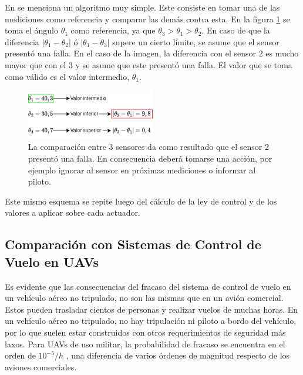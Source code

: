 En \cite[p.~221]{collinson2023introduction} se menciona un algoritmo muy simple. Este consiste en tomar una de las mediciones como referencia y comparar las demás contra esta. En la figura \ref{fig:votacion_sensores} se toma el ángulo $\theta_1$ como referencia, ya que $\theta_3 > \theta_1 > \theta_2$. En caso de que la diferencia $| \theta_1 - \theta_2 |$ ó $| \theta_1 - \theta_3 |$ supere un cierto límite, se asume que el sensor presentó una falla. En el caso de la imagen, la diferencia con el sensor 2 es mucho mayor que con el 3 y se asume que este presentó una falla. El valor que se toma como válido es el valor intermedio, $\theta_1$.

\begin{figure}[H]
    \centering
    \includegraphics[width=0.5\textwidth]{img/votacion_sensores.png}
    \caption{La comparación entre 3 sensores da como resultado que el sensor 2 presentó una falla. En consecuencia deberá tomarse una acción, por ejemplo ignorar al sensor en próximas mediciones o informar al piloto.}
    \label{fig:votacion_sensores}
\end{figure}

Este mismo esquema se repite luego del cálculo de la ley de control y de los valores a aplicar sobre cada actuador.

\subsection{Comparación con Sistemas de Control de Vuelo en UAVs}

Es evidente que las consecuencias del fracaso del sistema de control de vuelo en un vehículo aéreo no tripulado, no son las mismas que en un avión comercial. Estos pueden trasladar cientos de personas y realizar vuelos de muchas horas. En un vehículo aéreo no tripulado, no hay tripulación ni piloto a bordo del vehículo, por lo que suelen estar construidos con otros requerimientos de seguridad más laxos. Para UAVs de uso militar, la probabilidad de fracaso se encuentra en el orden de $10^{-5} / h$ \cite{zhang2020architecture}\cite[p.~491]{collinson2023introduction}, una diferencia de varios órdenes de magnitud respecto de los aviones comerciales.\\

